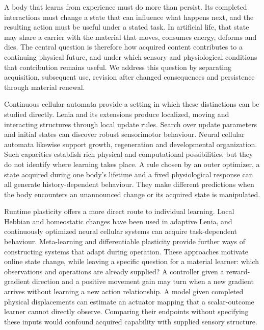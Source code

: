 A body that learns from experience must do more than persist. Its completed interactions must change a state that can influence what happens next, and the resulting action must be useful under a stated task. In artificial life, that state may share a carrier with the material that moves, consumes energy, deforms and dies. The central question is therefore how acquired content contributes to a continuing physical future, and under which sensory and physiological conditions that contribution remains useful. We address this question by separating acquisition, subsequent use, revision after changed consequences and persistence through material renewal.

Continuous cellular automata provide a setting in which these distinctions can be studied directly. Lenia and its extensions produce localized, moving and interacting structures through local update rules\cite{chan,expandedlenia,plantec}. Search over update parameters and initial states can discover robust sensorimotor behaviour\cite{hamon,asal}. Neural cellular automata likewise support growth, regeneration and developmental organization\cite{growingca,developmental,bricks}. Such capacities establish rich physical and computational possibilities, but they do not identify where learning takes place. A rule chosen by an outer optimizer, a state acquired during one body's lifetime and a fixed physiological response can all generate history-dependent behaviour. They make different predictions when the body encounters an unannounced change or its acquired state is manipulated.

Runtime plasticity offers a more direct route to individual learning. Local Hebbian and homeostatic changes have been used in adaptive Lenia, and continuously optimized neural cellular systems can acquire task-dependent behaviour\cite{khajehabdollahi,pdnca}. Meta-learning and differentiable plasticity provide further ways of constructing systems that adapt during operation\cite{duan,wang,miconi,backpropamine}. These approaches motivate online state change, while leaving a specific question for a material learner: which observations and operations are already supplied? A controller given a reward-gradient direction and a positive movement gain may turn when a new gradient arrives without learning a new action relationship. A model given completed physical displacements can estimate an actuator mapping that a scalar-outcome learner cannot directly observe. Comparing their endpoints without specifying these inputs would confound acquired capability with supplied sensory structure.

